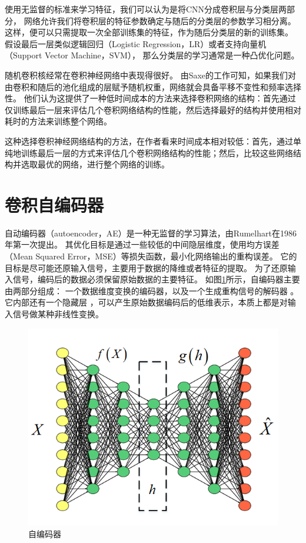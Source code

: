 使用无监督的标准来学习特征，我们可以认为是将CNN分成卷积层与分类层两部分，
网络允许我们将卷积层的特征参数确定与随后的分类层的参数学习相分离。
这样，便可以只需提取一次全部训练集的特征，作为随后分类层的新的训练集。
假设最后一层类似逻辑回归（Logistic Regression，LR）或者支持向量机（Support Vector Machine，SVM），
那么分类层的学习通常是一种凸优化问题。\par
随机卷积核经常在卷积神经网络中表现得很好。
由Saxe的工作可知，如果我们对由卷积和随后的池化组成的层赋予随机权重，网络就会具备平移不变性和频率选择性\cite{saxe2011random}。
他们认为这提供了一种低时间成本的方法来选择卷积网络的结构：首先通过仅训练最后一层来评估几个卷积网络结构的性能，然后选择最好的结构并使用相对耗时的方法来训练整个网络。

这种选择卷积神经网络结构的方法，在作者看来时间成本相对较低：首先，通过单纯地训练最后一层的方式来评估几个卷积网络结构的性能；然后，比较这些网络结构并选取最优的网络，进行整个网络的训练。


\section{卷积自编码器}

自动编码器（autoencoder，AE）是一种无监督的学习算法，由Rumelhart在1986年第一次提出\cite{rumelhart1986learning}。
其优化目标是通过一些较低的中间隐层维度，使用均方误差（Mean Squared Error，MSE）等损失函数，最小化网络输出的重构误差。
它的目标是尽可能还原输入信号，主要用于数据的降维或者特征的提取。
为了还原输入信号，编码后的数据必须保留原始数据的主要特征。
如图\ref{sec:fig_2_5}所示，自编码器主要由两部分组成：
一个数据维度变换的编码器，以及一个生成重构信号的解码器 。
它内部还有一个隐藏层 ，可以产生原始数据编码后的低维表示，本质上都是对输入信号做某种非线性变换。\par
\begin{figure}[!h]
	\centering
	\includegraphics[scale=0.7]{figures/chapter_2/fig_2_5}
	\caption{自编码器}	\label{sec:fig_2_5}
\end{figure}

